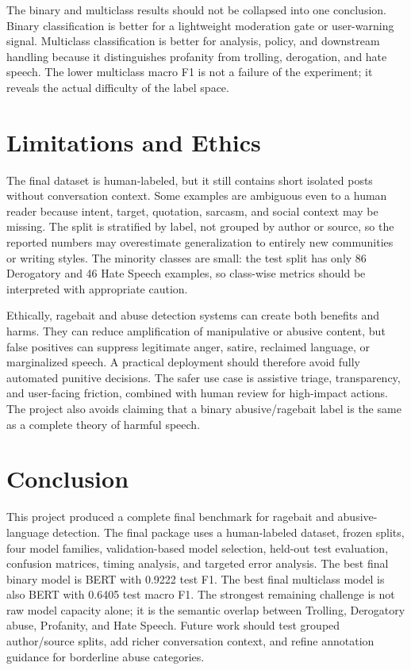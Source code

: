 \documentclass[11pt]{article}
\begin{document}
The binary and multiclass results should not be collapsed into one conclusion. Binary classification is better for a lightweight moderation gate or user-warning signal. Multiclass classification is better for analysis, policy, and downstream handling because it distinguishes profanity from trolling, derogation, and hate speech. The lower multiclass macro F1 is not a failure of the experiment; it reveals the actual difficulty of the label space.

\section{Limitations and Ethics}

The final dataset is human-labeled, but it still contains short isolated posts without conversation context. Some examples are ambiguous even to a human reader because intent, target, quotation, sarcasm, and social context may be missing. The split is stratified by label, not grouped by author or source, so the reported numbers may overestimate generalization to entirely new communities or writing styles. The minority classes are small: the test split has only 86 Derogatory and 46 Hate Speech examples, so class-wise metrics should be interpreted with appropriate caution.

Ethically, ragebait and abuse detection systems can create both benefits and harms. They can reduce amplification of manipulative or abusive content, but false positives can suppress legitimate anger, satire, reclaimed language, or marginalized speech. A practical deployment should therefore avoid fully automated punitive decisions. The safer use case is assistive triage, transparency, and user-facing friction, combined with human review for high-impact actions. The project also avoids claiming that a binary abusive/ragebait label is the same as a complete theory of harmful speech.

\section{Conclusion}

This project produced a complete final benchmark for ragebait and abusive-language detection. The final package uses a human-labeled dataset, frozen splits, four model families, validation-based model selection, held-out test evaluation, confusion matrices, timing analysis, and targeted error analysis. The best final binary model is BERT with 0.9222 test F1. The best final multiclass model is also BERT with 0.6405 test macro F1. The strongest remaining challenge is not raw model capacity alone; it is the semantic overlap between Trolling, Derogatory abuse, Profanity, and Hate Speech. Future work should test grouped author/source splits, add richer conversation context, and refine annotation guidance for borderline abuse categories.
\end{document}
